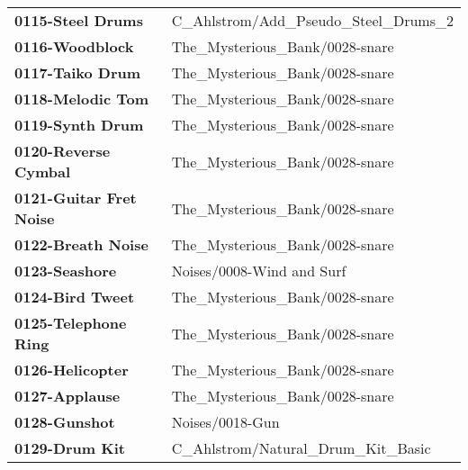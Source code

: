 \begin{longtable}{|l l|}
      \textbf{0115-Steel Drums} &
         C\_Ahlstrom/Add\_Pseudo\_Steel\_Drums\_2 \\
      \textbf{0116-Woodblock} &
         The\_Mysterious\_Bank/0028-snare \\
      \textbf{0117-Taiko Drum} &
         The\_Mysterious\_Bank/0028-snare \\
      \textbf{0118-Melodic Tom} &
         The\_Mysterious\_Bank/0028-snare \\
      \textbf{0119-Synth Drum} &
         The\_Mysterious\_Bank/0028-snare \\
      \textbf{0120-Reverse Cymbal} &
         The\_Mysterious\_Bank/0028-snare \\
      \textbf{0121-Guitar Fret Noise} &
         The\_Mysterious\_Bank/0028-snare \\
      \textbf{0122-Breath Noise} &
         The\_Mysterious\_Bank/0028-snare \\
      \textbf{0123-Seashore} &
         Noises/0008-Wind and Surf \\
      \textbf{0124-Bird Tweet} &
         The\_Mysterious\_Bank/0028-snare \\
      \textbf{0125-Telephone Ring} &
         The\_Mysterious\_Bank/0028-snare \\
      \textbf{0126-Helicopter} &
         The\_Mysterious\_Bank/0028-snare \\
      \textbf{0127-Applause} &
         The\_Mysterious\_Bank/0028-snare \\
      \textbf{0128-Gunshot} &
         Noises/0018-Gun \\
      \textbf{0129-Drum Kit} &
         C\_Ahlstrom/Natural\_Drum\_Kit\_Basic \\
   \end{longtable}

